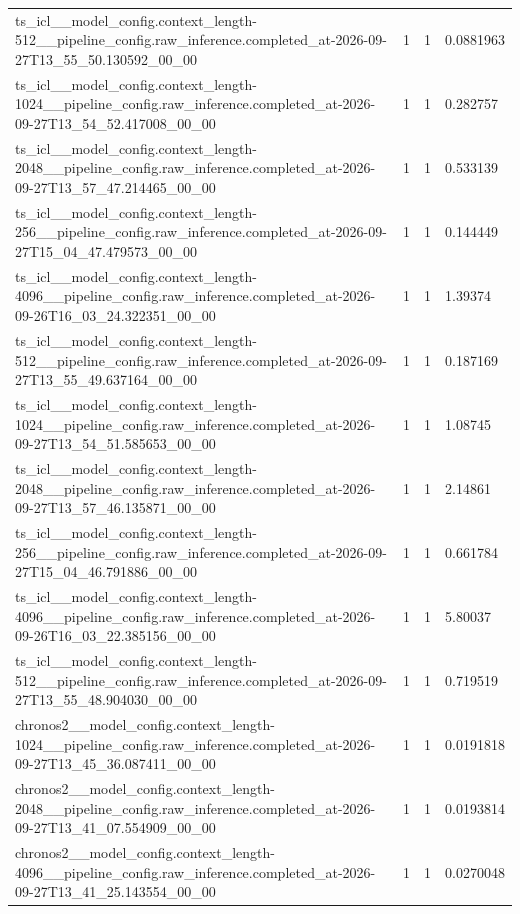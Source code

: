 \begin{tabular}{llll}
ts\_icl\_\_model\_config.context\_length-512\_\_pipeline\_config.raw\_inference.completed\_at-2026-09-27T13\_55\_50.130592\_00\_00 & 1 & 1 & 0.0881963 \\
ts\_icl\_\_model\_config.context\_length-1024\_\_pipeline\_config.raw\_inference.completed\_at-2026-09-27T13\_54\_52.417008\_00\_00 & 1 & 1 & 0.282757 \\
ts\_icl\_\_model\_config.context\_length-2048\_\_pipeline\_config.raw\_inference.completed\_at-2026-09-27T13\_57\_47.214465\_00\_00 & 1 & 1 & 0.533139 \\
ts\_icl\_\_model\_config.context\_length-256\_\_pipeline\_config.raw\_inference.completed\_at-2026-09-27T15\_04\_47.479573\_00\_00 & 1 & 1 & 0.144449 \\
ts\_icl\_\_model\_config.context\_length-4096\_\_pipeline\_config.raw\_inference.completed\_at-2026-09-26T16\_03\_24.322351\_00\_00 & 1 & 1 & 1.39374 \\
ts\_icl\_\_model\_config.context\_length-512\_\_pipeline\_config.raw\_inference.completed\_at-2026-09-27T13\_55\_49.637164\_00\_00 & 1 & 1 & 0.187169 \\
ts\_icl\_\_model\_config.context\_length-1024\_\_pipeline\_config.raw\_inference.completed\_at-2026-09-27T13\_54\_51.585653\_00\_00 & 1 & 1 & 1.08745 \\
ts\_icl\_\_model\_config.context\_length-2048\_\_pipeline\_config.raw\_inference.completed\_at-2026-09-27T13\_57\_46.135871\_00\_00 & 1 & 1 & 2.14861 \\
ts\_icl\_\_model\_config.context\_length-256\_\_pipeline\_config.raw\_inference.completed\_at-2026-09-27T15\_04\_46.791886\_00\_00 & 1 & 1 & 0.661784 \\
ts\_icl\_\_model\_config.context\_length-4096\_\_pipeline\_config.raw\_inference.completed\_at-2026-09-26T16\_03\_22.385156\_00\_00 & 1 & 1 & 5.80037 \\
ts\_icl\_\_model\_config.context\_length-512\_\_pipeline\_config.raw\_inference.completed\_at-2026-09-27T13\_55\_48.904030\_00\_00 & 1 & 1 & 0.719519 \\
chronos2\_\_model\_config.context\_length-1024\_\_pipeline\_config.raw\_inference.completed\_at-2026-09-27T13\_45\_36.087411\_00\_00 & 1 & 1 & 0.0191818 \\
chronos2\_\_model\_config.context\_length-2048\_\_pipeline\_config.raw\_inference.completed\_at-2026-09-27T13\_41\_07.554909\_00\_00 & 1 & 1 & 0.0193814 \\
chronos2\_\_model\_config.context\_length-4096\_\_pipeline\_config.raw\_inference.completed\_at-2026-09-27T13\_41\_25.143554\_00\_00 & 1 & 1 & 0.0270048 \\

\end{tabular}
